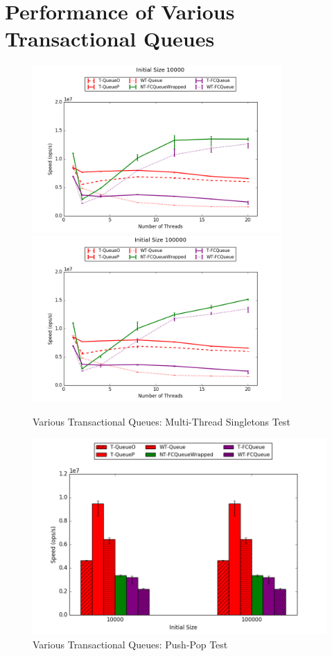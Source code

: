 \section{Performance of Various Transactional Queues}
\begin{figure}[H]
    \centering
    \includegraphics[width=0.85\textwidth]{fcqueues/allQ:RandSingleOps10000.png}
    \vspace{20pt}
    \includegraphics[width=0.85\textwidth]{fcqueues/allQ:RandSingleOps100000.png}
    \caption{Various Transactional Queues: Multi-Thread Singletons Test}
\end{figure}
\begin{figure}[H]
    \centering
    \includegraphics[width=\textwidth]{fcqueues/allQ:PushPop.png}
    \caption{Various Transactional Queues: Push-Pop Test}
\end{figure}

